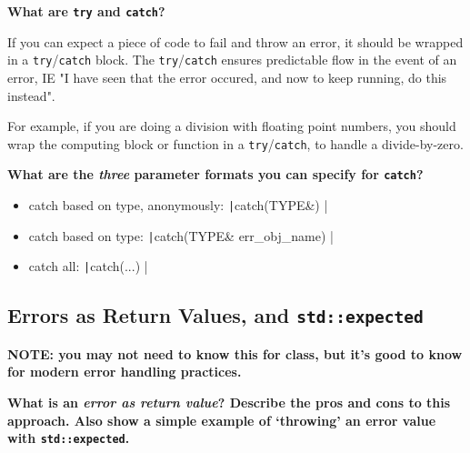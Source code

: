 \documentclass[12pt, letterpaper]{article}
\newcommand{\question}[1]{\textbf{#1}\par}
\newenvironment{answerblock}{\color{Green4}}{\normalcolor\vspace{1em}}
\begin{document}
\question{What are \texttt{try} and \texttt{catch}?}

\begin{answerblock}
If you can expect a piece of code to fail and throw an error, it should be
wrapped in a \texttt{try}/\texttt{catch} block. The \texttt{try}/\texttt{catch}
ensures predictable flow in the event of an error, IE "I have seen that the
error occured, and now to keep running, do this instead".

For example, if you are doing a division with floating point numbers, you
should wrap the computing block or function in a \texttt{try}/\texttt{catch},
to handle a divide-by-zero.
\end{answerblock}

\question{What are the \emph{three} parameter formats you can specify for
\texttt{catch}?}

\begin{answerblock}
\begin{itemize}
    \item catch based on type, anonymously:
    \texttt|catch(TYPE&) {}|
    \item catch based on type:
    \texttt|catch(TYPE& err_obj_name) {}|
    \item catch all:
    \texttt|catch(...) {}|
\end{itemize}
\end{answerblock}

\subsection{Errors as Return Values, and \texttt{std::expected}}

\textbf{NOTE: you may not need to know this for class, but it's good to know
for modern error handling practices.}

\question{What is an \emph{error as return value}? Describe the pros and cons
to this approach. Also show a simple example of {\lq{throwing}\rq}  an error value with
\texttt{std::expected}.}
\end{document}
